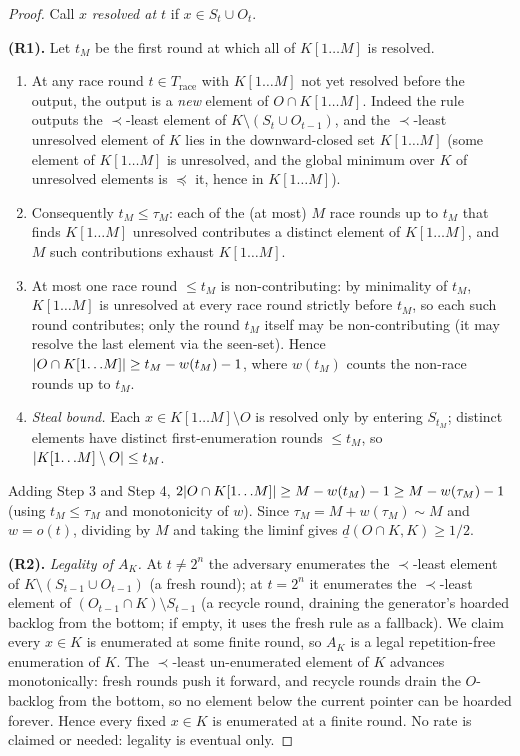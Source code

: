 \documentclass[11pt]{article}
\numberwithin{equation}{section}
\DeclarePairedDelimiter{\abs}{\lvert}{\rvert}
\newcommand{\Seen}{S}
\newcommand{\Out}{O}
\newcommand{\dlow}[2]{\underline{d}(#1,#2)}
\newcommand{\rest}[2]{#1[1\!\dots\! #2]}
\theoremstyle{plain}
\theoremstyle{definition}
\theoremstyle{remark}
\begin{document}
\begin{statementbox}
\LemRace*
\end{statementbox}
\begin{proof}
Call $x$ \emph{resolved at $t$} if $x \in \Seen_t \cup \Out_t$.

\medskip\noindent\textbf{(R1).}\quad
Let $t_M$ be the first round at which all of $\rest{K}{M}$ is resolved.
\begin{enumerate}[label=\textup{Step \arabic*.}, leftmargin=3.4em]
  \item At any race round $t \in T_{\mathrm{race}}$ with $\rest{K}{M}$ not yet resolved before
    the output, the output is a \emph{new} element of $\Out \cap \rest{K}{M}$. Indeed the rule
    outputs the $\prec$-least element of $K \setminus (\Seen_t \cup \Out_{t-1})$, and the
    $\prec$-least unresolved element of $K$ lies in the downward-closed set $\rest{K}{M}$
    (some element of $\rest{K}{M}$ is unresolved, and the global minimum over $K$ of
    unresolved elements is $\preceq$ it, hence in $\rest{K}{M}$).
  \item Consequently $t_M \le \tau_M$: each of the (at most) $M$ race rounds up to $t_M$ that
    finds $\rest{K}{M}$ unresolved contributes a distinct element of $\rest{K}{M}$, and $M$
    such contributions exhaust $\rest{K}{M}$.
  \item At most one race round $\le t_M$ is non-contributing: by minimality of $t_M$,
    $\rest{K}{M}$ is unresolved at every race round strictly before $t_M$, so each such round
    contributes; only the round $t_M$ itself may be non-contributing (it may resolve the last
    element via the seen-set). Hence $\abs{\Out \cap \rest{K}{M}} \ge t_M - w(t_M) - 1$, where
    $w(t_M)$ counts the non-race rounds up to $t_M$.
  \item \emph{Steal bound.} Each $x \in \rest{K}{M} \setminus \Out$ is resolved only by
    entering $\Seen_{t_M}$; distinct elements have distinct first-enumeration rounds $\le
    t_M$, so $\abs{\rest{K}{M} \setminus \Out} \le t_M$.
\end{enumerate}
Adding Step 3 and Step 4, $2\abs{\Out \cap \rest{K}{M}} \ge M - w(t_M) - 1 \ge M - w(\tau_M) -
1$ (using $t_M \le \tau_M$ and monotonicity of $w$). Since $\tau_M = M + w(\tau_M) \sim M$ and
$w = o(t)$, dividing by $M$ and taking the liminf gives $\dlow{\Out \cap K}{K} \ge 1/2$.

\medskip\noindent\textbf{(R2).}\quad
\emph{Legality of $A_K$.} At $t \ne 2^n$ the adversary enumerates the $\prec$-least element of
$K \setminus (\Seen_{t-1} \cup \Out_{t-1})$ (a fresh round); at $t = 2^n$ it enumerates the
$\prec$-least element of $(\Out_{t-1} \cap K) \setminus \Seen_{t-1}$ (a recycle round,
draining the generator's hoarded backlog from the bottom; if empty, it uses the fresh rule as
a fallback). We claim every $x \in K$ is enumerated at some finite round, so $A_K$ is a legal
repetition-free enumeration of $K$. The $\prec$-least un-enumerated element of $K$ advances
monotonically: fresh rounds push it forward, and recycle rounds drain the $\Out$-backlog from
the bottom, so no element below the current pointer can be hoarded forever. Hence every fixed
$x \in K$ is enumerated at a finite round. No rate is claimed or needed: legality is eventual
only.


\end{proof}
\end{document}
